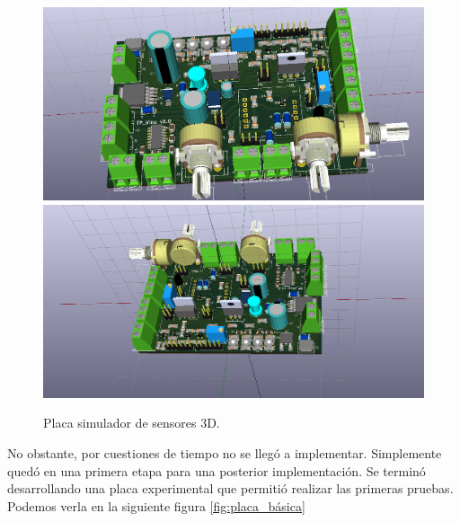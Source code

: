 \begin{figure}[h]
  \centering
  \includegraphics[scale=0.3]{./Figures/pcb_3d.png}
  \includegraphics[scale=0.3]{./Figures/pcb_3d_back.png}
  \caption{Placa simulador de sensores 3D.}
  \label{fig:pcb3d}
\end{figure}

No obstante, por cuestiones de tiempo no se llegó a implementar. Simplemente quedó en una primera etapa para una posterior implementación. Se terminó desarrollando una placa experimental que permitió realizar las primeras pruebas. Podemos verla en la siguiente figura \ref{fig:placa_básica}

